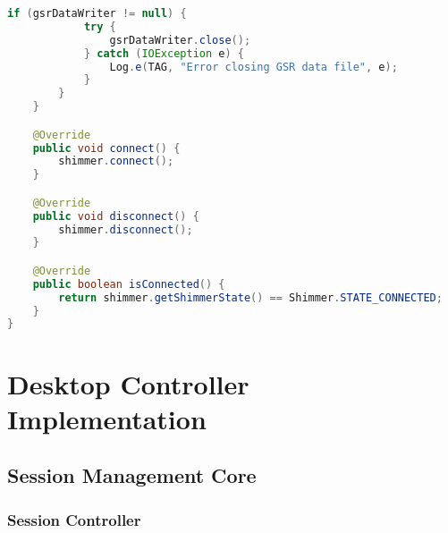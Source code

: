 \begin{lstlisting}[language=Java, caption=Shimmer GSR Sensor Integration]
        if (gsrDataWriter != null) {
            try {
                gsrDataWriter.close();
            } catch (IOException e) {
                Log.e(TAG, "Error closing GSR data file", e);
            }
        }
    }

    @Override
    public void connect() {
        shimmer.connect();
    }

    @Override
    public void disconnect() {
        shimmer.disconnect();
    }

    @Override
    public boolean isConnected() {
        return shimmer.getShimmerState() == Shimmer.STATE_CONNECTED;
    }
}
\end{lstlisting}

\section{Desktop Controller Implementation}

\subsection{Session Management Core}

\subsubsection{Session Controller}

